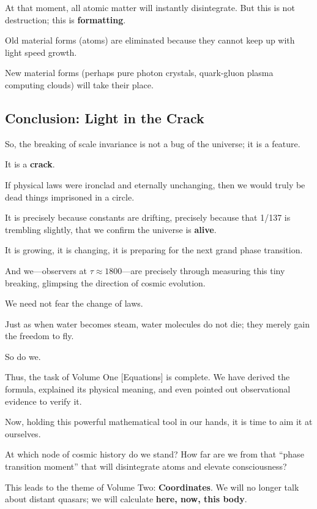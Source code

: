 At that moment, all atomic matter will instantly disintegrate. But this is not destruction; this is \textbf{formatting}.

Old material forms (atoms) are eliminated because they cannot keep up with light speed growth.

New material forms (perhaps pure photon crystals, quark-gluon plasma computing clouds) will take their place.

\subsection{Conclusion: Light in the Crack}

So, the breaking of scale invariance is not a bug of the universe; it is a feature.

It is a \textbf{crack}.

If physical laws were ironclad and eternally unchanging, then we would truly be dead things imprisoned in a circle.

It is precisely because constants are drifting, precisely because that 1/137 is trembling slightly, that we confirm the universe is \textbf{alive}.

It is growing, it is changing, it is preparing for the next grand phase transition.

And we---observers at $\tau \approx 1800$---are precisely through measuring this tiny breaking, glimpsing the direction of cosmic evolution.

We need not fear the change of laws.

Just as when water becomes steam, water molecules do not die; they merely gain the freedom to fly.

So do we.

Thus, the task of Volume One [Equations] is complete. We have derived the formula, explained its physical meaning, and even pointed out observational evidence to verify it.

Now, holding this powerful mathematical tool in our hands, it is time to aim it at ourselves.

At which node of cosmic history do we stand? How far are we from that ``phase transition moment'' that will disintegrate atoms and elevate consciousness?

This leads to the theme of Volume Two: \textbf{Coordinates}. We will no longer talk about distant quasars; we will calculate \textbf{here, now, this body}.


